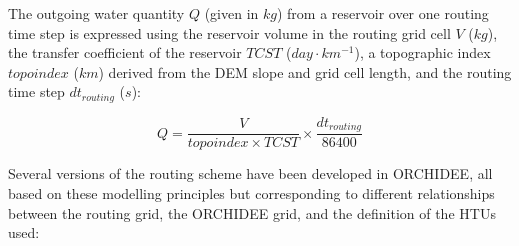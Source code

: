The outgoing water quantity $Q$ (given in $kg$) from a reservoir over one routing time step is expressed using the reservoir volume in the routing grid cell $V$ ($kg$), the transfer coefficient of the reservoir $TCST$ ($day \cdot km^{-1}$), a topographic index $topoindex$ ($km$) derived from the DEM slope and grid cell length, and the routing time step $dt_{routing}$ ($s$):

\begin{equation}
    Q = \frac{V}{topoindex \times TCST} \times \frac{dt_{routing}}{86400}
\end{equation}

Several versions of the routing scheme have been developed in ORCHIDEE, all based on these modelling principles but corresponding to different relationships between the routing grid, the ORCHIDEE grid, and the definition of the HTUs used:


